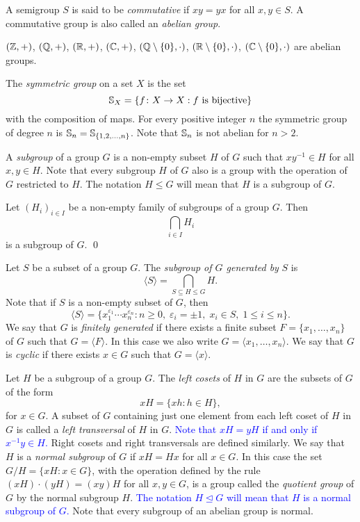 A semigroup $S$ is said to be {\em commutative} if $xy=yx$ for all $x,y\in S$. A commutative group is also called an {\em abelian group}.

\begin{example}
 $(\mathbb{Z}, +)$,  $(\mathbb{Q}, +)$, $(\mathbb{R}, +)$, $(\mathbb{C}, +)$, $(\mathbb{Q}\setminus\{0\}, \cdot)$, $(\mathbb{R}\setminus\{0\}, \cdot)$, 
	$(\mathbb{C}\setminus\{0\}, \cdot)$ are abelian groups.
\end{example}

\begin{example}
The {\em symmetric group} on a set $X$ is the set 
\[
\mathbb{S}_X=\{ f\colon X\rightarrow X: f \mbox{ is bijective}\}
\]
with the composition of maps. For every positive integer $n$ the symmetric group of degree $n$ is
$\mathbb{S}_n=\mathbb{S}_{\{ 1,2,\dots ,n\}}$. Note that $\mathbb{S}_n$ is not abelian for $n>2$.
\end{example}    

A {\em subgroup} of a group $G$ is a non-empty subset $H$ of $G$ such that $xy^{-1}\in H$ for all $x,y\in H$. 
Note that every subgroup $H$ of $G$ also is a group with the operation of $G$ restricted to $H$.
The notation $H\leq G$ will mean that $H$ is a subgroup of $G$.

\begin{proposition}
\label{intersection}
	Let $(H_i)_{i\in I}$ be a non-empty family of subgroups of a group $G$. Then 
	\[ 
	\bigcap_{i\in I}H_i 
	\]
    is a subgroup of $G$. \qed
\end{proposition}   

Let $S$ be a subset of a group $G$. The \emph{subgroup of $G$ generated by} 
$S$ is
\[
\langle S\rangle=\bigcap_{S\subseteq H\leq G}H.
\]
Note that if $S$ is a non-empty subset of $G$, then
\[
\langle S\rangle=\{ x_1^{\varepsilon_1}\cdots x_n^{\varepsilon_n}: n\geq0,\; \varepsilon_i=\pm 1,\; x_i\in S,\; 1\leq i\leq n \}.
\]
We say that $G$ is {\em finitely generated} if there exists a finite subset $F=\{ x_1,\dots ,x_n\}$ of $G$ such that $G=\langle F\rangle$. In this case we also write $G=\langle x_1,\dots ,x_n\rangle$. We say that $G$ is {\em cyclic} if there exists $x\in G$ such that $G=\langle x\rangle$. 

Let $H$ be a subgroup of a group $G$. The {\em left cosets} of $H$ in $G$ are 
the subsets of $G$ of the form
\[
xH=\{ xh: h\in H\},
\]
for $x\in G$. A subset of $G$ containing just one element from each left coset of $H$ in $G$ is called a {\em left transversal} of $H$ in $G$. 
\textcolor{blue}{Note that $xH=yH$ if and only if $x^{-1}y\in H$.}
Right cosets and right transversals are defined similarly.
We say that $H$ is a {\em normal subgroup} of $G$ if $xH=Hx$ for all $x\in G$. In this case the set
$G/H=\{xH: x\in G\}$, with the operation defined by the rule $(xH)\cdot (yH)=(xy)H$ for all $x,y\in G$, 
is a group called the {\em quotient group} of $G$ by the normal subgroup $H$. 
\textcolor{blue}{The notation $H\unlhd G$ will mean that $H$ is a normal subgroup of $G$.}
Note that every subgroup of an abelian group is normal.

